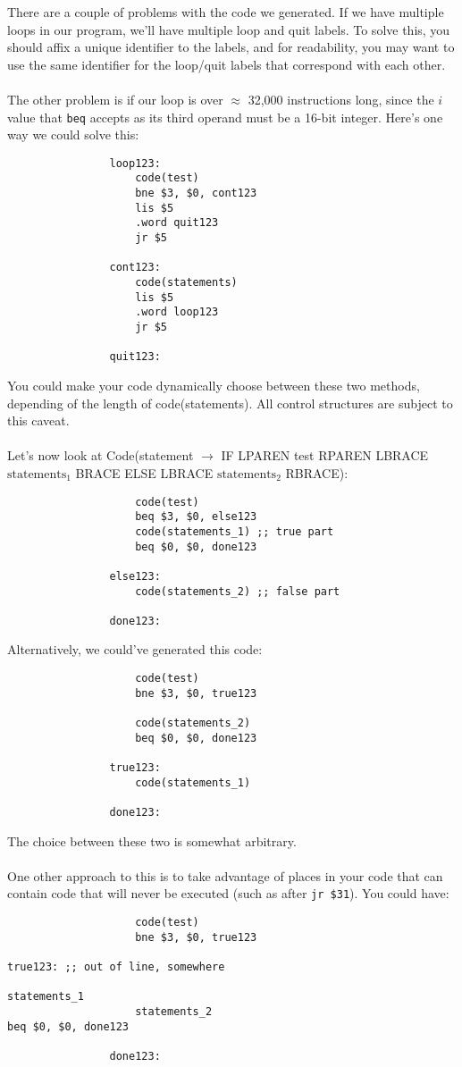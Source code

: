 \documentclass[]{article}
\theoremstyle{definition}
\begin{document}
				There are a couple of problems with the code we generated. If we have multiple loops in our program, we'll have multiple loop and quit labels. To solve this, you should affix a unique identifier to the labels, and for readability, you may want to use the same identifier for the loop/quit labels that correspond with each other.
				\\ \\
				The other problem is if our loop is over $\approx$ 32,000 instructions long, since the $i$ value that \verb+beq+ accepts as its third operand must be a 16-bit integer. Here's one way we could solve this:
				\begin{verbatim}
				loop123:
				    code(test)
				    bne $3, $0, cont123
				    lis $5
				    .word quit123
				    jr $5

				cont123:
				    code(statements)
				    lis $5
				    .word loop123
				    jr $5

				quit123:
				\end{verbatim}

				You could make your code dynamically choose between these two methods, depending of the length of code(statements). All control structures are subject to this caveat.
				\\ \\
				Let's now look at Code(statement $\to$ IF LPAREN test RPAREN LBRACE $\text{statements}_1$ BRACE ELSE LBRACE $\text{statements}_2$ RBRACE):
				\begin{verbatim}
				    code(test)
				    beq $3, $0, else123
				    code(statements_1) ;; true part
				    beq $0, $0, done123
				
				else123:
				    code(statements_2) ;; false part

				done123:
				\end{verbatim}

				Alternatively, we could've generated this code:
				\begin{verbatim}
				    code(test)
				    bne $3, $0, true123

				    code(statements_2)
				    beq $0, $0, done123

				true123:
				    code(statements_1)

				done123:
				\end{verbatim}

				The choice between these two is somewhat arbitrary.
				\\ \\
				One other approach to this is to take advantage of places in your code that can contain code that will never be executed (such as after \verb+jr $31+). You could have:
				\begin{verbatim}
				    code(test)
				    bne $3, $0, true123
				                                                true123: ;; out of line, somewhere
				                                                    statements_1
				    statements_2                                    beq $0, $0, done123
 
				done123:
				\end{verbatim}
\end{document}
